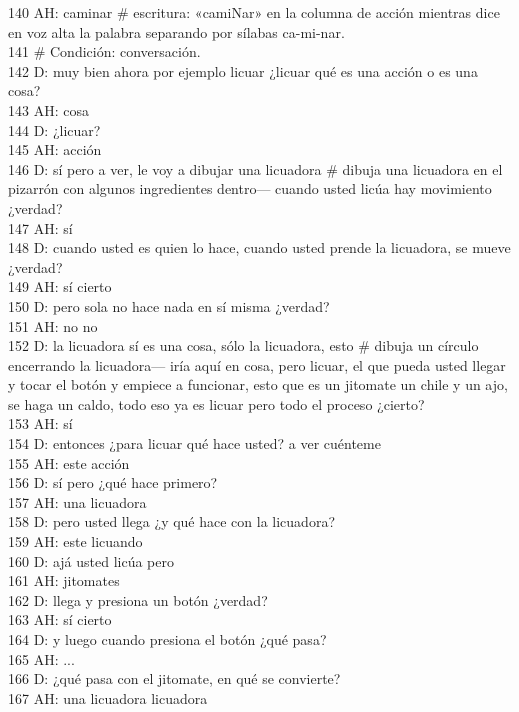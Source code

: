 140 AH: caminar \# escritura: «camiNar» en la columna de acción mientras dice en voz alta la palabra separando por sílabas ca-mi-nar.\\
141 \# Condición: conversación.\\
142 D: muy bien ahora por ejemplo licuar ¿licuar qué es una acción o es una cosa?\\
143 AH: cosa\\
144 D: ¿licuar?\\
145 AH: acción\\
146 D: sí pero a ver, le voy a dibujar una licuadora \# dibuja una licuadora en el pizarrón con algunos ingredientes dentro--- cuando usted licúa hay movimiento ¿verdad?\\
147 AH: sí\\
148 D: cuando usted es quien lo hace, cuando usted prende la licuadora, se mueve ¿verdad?\\
149 AH: sí cierto\\
150 D: pero sola no hace nada en sí misma ¿verdad?\\
151 AH: no no\\
152 D: la licuadora sí es una cosa, sólo la licuadora, esto \# dibuja un círculo encerrando la licuadora--- iría aquí en cosa, pero licuar, el que pueda usted llegar y tocar el botón y empiece a funcionar, esto que es un jitomate un chile y un ajo, se haga un caldo, todo eso ya es licuar pero todo el proceso ¿cierto?\\
153 AH: sí\\
154 D: entonces ¿para licuar qué hace usted? a ver cuénteme\\
155 AH: este acción\\
156 D: sí pero ¿qué hace primero?\\
157 AH: una licuadora\\
158 D: pero usted llega ¿y qué hace con la licuadora?\\
159 AH: este licuando\\
160 D: ajá usted licúa pero\\
161 AH: jitomates\\
162 D: llega y presiona un botón ¿verdad?\\
163 AH: sí cierto\\
164 D: y luego cuando presiona el botón ¿qué pasa?\\
165 AH: ...\\
166 D: ¿qué pasa con el jitomate, en qué se convierte?\\
167 AH: una licuadora licuadora\\
